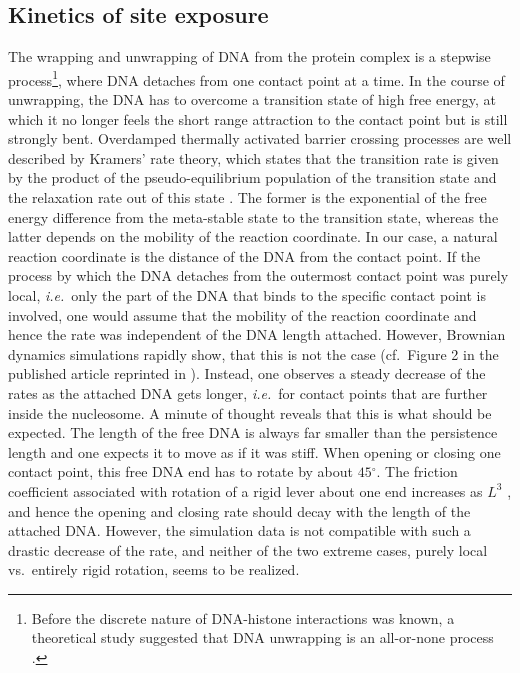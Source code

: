 \subsection{\label{sec:nuc_kinetics}Kinetics of site exposure}
The wrapping and unwrapping of DNA from the protein complex is a stepwise process\footnote{Before 
the discrete nature of DNA-histone interactions was known, 
a theoretical study suggested that DNA unwrapping is an all-or-none process \cite{Marky_JMB_95}.}, 
where DNA detaches from one contact point at a time. In the course of unwrapping, the DNA has to overcome
a transition state of high free energy, at which it no longer feels the short range attraction to the contact
point but is still strongly bent. Overdamped thermally activated barrier crossing processes are well 
described by Kramers' rate theory, which states that the transition rate is given by the product of 
the pseudo-equilibrium population of the transition state and the relaxation rate out of this state \cite{Kramers_Physica_40, Haenggi_RevModPhys_90}.
The former is the exponential of the free energy difference from the meta-stable state to the transition state,
whereas the latter depends on the mobility of the reaction coordinate. In our case, a natural reaction coordinate
is the distance of the DNA from the contact point.
If the process by which the DNA detaches from the outermost contact point
was purely local, \emph{i.e.}~only the part of the DNA that binds to the specific contact point is involved, 
one would assume that the mobility of the reaction coordinate and hence the rate was independent 
of the DNA length attached. 
However, Brownian dynamics simulations rapidly show, that this is not the 
case (cf.~Figure 2 in the published article reprinted in ).
Instead, one observes a steady decrease of the rates as the attached DNA gets longer, 
\emph{i.e.}~for contact points that are further inside the nucleosome. 
A minute of thought reveals that this is what should be expected.
The length of the free DNA is always far smaller than the persistence length and
one expects it to move as if it was stiff. When opening or closing one contact point, 
this free DNA end has to rotate by about $45{}^{\circ}$. 
The friction coefficient associated with rotation of a rigid lever about one end increases
as $L^{3}$ \cite{Doi_86}, and hence the opening and closing rate should decay 
with the length of the attached DNA. 
However, the simulation data is not compatible with such a drastic decrease
 of the rate, and neither of the two extreme cases, purely local vs.~entirely rigid
rotation, seems to be realized.

